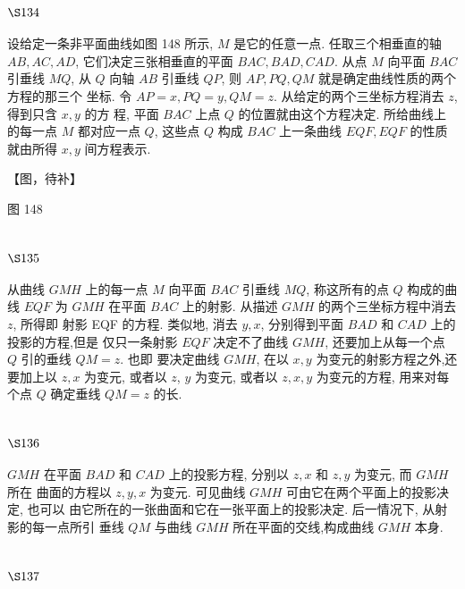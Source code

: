 \section{$\S 134$}

设给定一条非平面曲线如图 148 所示, $M$ 是它的任意一点. 任取三个相垂直的轴 $A B, A C, A D$, 它们决定三张相垂直的平面 $B A C, B A D, C A D$. 从点 $M$ 向平面 $B A C$ 引垂线 $M Q$, 从 $Q$ 向轴 $A B$ 引垂线 $Q P$, 则 $A P, P Q, Q M$ 就是确定曲线性质的两个方程的那三个 坐标. 令 $A P=x, P Q=y, Q M=z$. 从给定的两个三坐标方程消去 $z$, 得到只含 $x, y$ 的方 程, 平面 $B A C$ 上点 $Q$ 的位置就由这个方程决定. 所给曲线上的每一点 $M$ 都对应一点 $Q$, 这些点 $Q$ 构成 $B A C$ 上一条曲线 $E Q F, E Q F$ 的性质就由所得 $x, y$ 间方程表示. 


【图，待补】

图 148

\section{$\S 135$}

从曲线 $G M H$ 上的每一点 $M$ 向平面 $B A C$ 引垂线 $M Q$, 称这所有的点 $Q$ 构成的曲线 $E Q F$ 为 $G M H$ 在平面 $B A C$ 上的射影. 从描述 $G M H$ 的两个三坐标方程中消去 $z$, 所得即 射影 EQF 的方程. 类似地, 消去 $y, x$, 分别得到平面 $B A D$ 和 $C A D$ 上的投影的方程,但是 仅只一条射影 $E Q F$ 决定不了曲线 $G M H$, 还要加上从每一个点 $Q$ 引的垂线 $Q M=z$. 也即 要决定曲线 $G M H$, 在以 $x, y$ 为变元的射影方程之外,还要加上以 $z, x$ 为变元, 或者以 $z$, $y$ 为变元, 或者以 $z, x, y$ 为变元的方程, 用来对每个点 $Q$ 确定垂线 $Q M=z$ 的长.

\section{$\S 136$}

$G M H$ 在平面 $B A D$ 和 $C A D$ 上的投影方程, 分别以 $z, x$ 和 $z, y$ 为变元, 而 $G M H$ 所在 曲面的方程以 $z, y, x$ 为变元. 可见曲线 $G M H$ 可由它在两个平面上的投影决定, 也可以 由它所在的一张曲面和它在一张平面上的投影决定. 后一情况下, 从射影的每一点所引 垂线 $Q M$ 与曲线 $G M H$ 所在平面的交线,构成曲线 $G M H$ 本身.

\section{$\S 137$}

